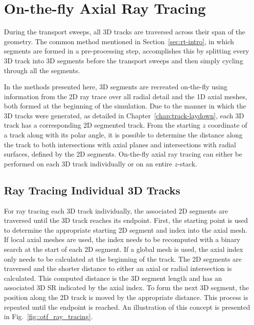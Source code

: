 \section{On-the-fly Axial Ray Tracing}
\label{sec:otf-axial-ray-tracing}

During the transport sweeps, all 3D tracks are traversed across their span of the geometry. The common method mentioned in Section~\ref{sec:rt-intro}, in which segments are formed in a pre-processing step, accomplishes this by splitting every 3D track into 3D segments before the transport sweeps and then simply cycling through all the segments.

In the methods presented here, 3D segments are recreated on-the-fly using information from the 2D ray trace over all radial detail and the 1D axial meshes, both formed at the beginning of the simulation. Due to the manner in which the 3D tracks were generated, as detailed in Chapter~\ref{chap:track-laydown}, each 3D track has a corresponding 2D segmented track. From the starting $z$ coordinate of a track along with its polar angle, it is possible to determine the distance along the track to both intersections with axial planes and intersections with radial surfaces, defined by the 2D segments. On-the-fly axial ray tracing can either be performed on each 3D track individually or on an entire $z$-stack.

\subsection{Ray Tracing Individual 3D Tracks}

For ray tracing each 3D track individually, the associated 2D segments are traversed until the 3D track reaches its endpoint. First, the starting point is used to determine the appropriate starting 2D segment and index into the axial mesh. If local axial meshes are used, the index needs to be recomputed with a binary search at the start of each 2D segment. If a global mesh is used, the axial index only needs to be calculated at the beginning of the track. The 2D segments are traversed and the shorter distance to either an axial or radial intersection is calculated. This computed distance is the 3D segment length and has an associated 3D \ac{SR} indicated by the axial index. To form the next 3D segment, the position along the 2D track is moved by the appropriate distance. This process is repeated until the endpoint is reached. An illustration of this concept is presented in Fig.~\ref{fig::otf_ray_tracing}.

